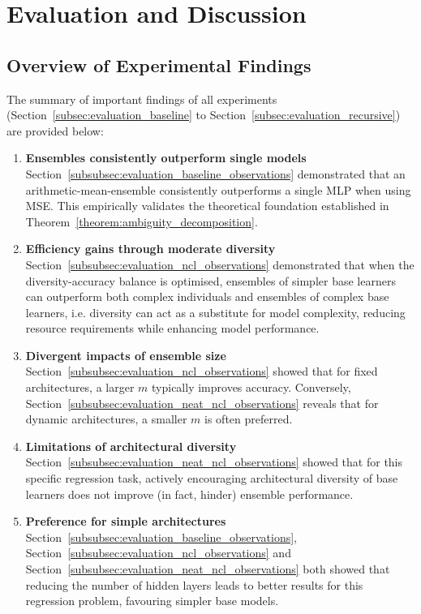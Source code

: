 \section{Evaluation and Discussion}
\label{sec:evaluation}


\subsection{Overview of Experimental Findings}
The summary of important findings of all experiments (Section~\ref{subsec:evaluation_baseline} to Section~\ref{subsec:evaluation_recursive}) are provided below: 
\begin{enumerate}
    \item \textbf{Ensembles consistently outperform single models} \\
    Section~\ref{subsubsec:evaluation_baseline_observations} demonstrated that an arithmetic-mean-ensemble consistently outperforms a single MLP when using MSE. This empirically validates the theoretical foundation established in Theorem~\ref{theorem:ambiguity_decomposition}. 

    \item \textbf{Efficiency gains through moderate diversity} \\
    Section~\ref{subsubsec:evaluation_ncl_observations} demonstrated that when the diversity-accuracy balance is optimised, ensembles of simpler base learners can outperform both complex individuals and ensembles of complex base learners, i.e. diversity can act as a substitute for model complexity, reducing resource requirements while enhancing model performance. 

    \item \textbf{Divergent impacts of ensemble size} \\
    Section~\ref{subsubsec:evaluation_ncl_observations} showed that for fixed architectures, a larger $m$ typically improves accuracy. Conversely, Section~\ref{subsubsec:evaluation_neat_ncl_observations} reveals that for dynamic architectures, a smaller $m$ is often preferred. 

    \item \textbf{Limitations of architectural diversity} \\
    Section~\ref{subsubsec:evaluation_neat_ncl_observations} showed that for this specific regression task, actively encouraging architectural diversity of base learners does not improve (in fact, hinder) ensemble performance. 

    \item \textbf{Preference for simple architectures} \\
    Section~\ref{subsubsec:evaluation_baseline_observations}, Section~\ref{subsubsec:evaluation_ncl_observations} and Section~\ref{subsubsec:evaluation_neat_ncl_observations} both showed that reducing the number of hidden layers leads to better results for this regression problem, favouring simpler base models. 


\end{enumerate}
